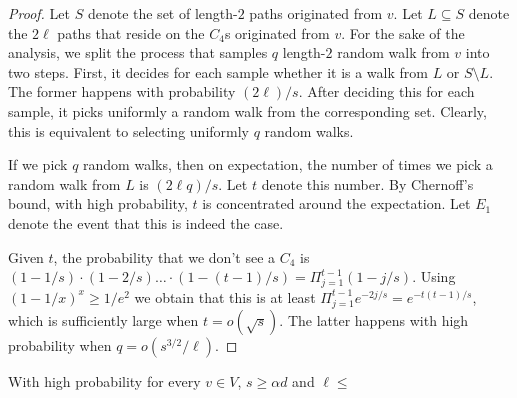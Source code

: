 \begin{proof}
Let $S$ denote the set of length-$2$ paths originated from $v$. 
Let $L \subseteq S$ denote the $2\ell$ paths that reside on the $C_4$s originated from $v$.
For the sake of the analysis, we split the process that samples $q$ length-$2$ random walk from $v$ into two steps.
First, it decides for each sample whether it is a walk from $L$ or $S\setminus L$. The former happens with probability $(2\ell)/s$.
After deciding this for each sample, it picks uniformly a random walk from the corresponding set.
Clearly, this is equivalent to selecting uniformly $q$ random walks.

If we pick $q$ random walks, then on expectation, the number of times we pick a random walk from $L$ is $(2\ell q)/s$.
Let $t$ denote this number.
By Chernoff's bound, with high probability, $t$ is concentrated around the expectation. 
Let $E_1$ denote the event that this is indeed the case.

Given $t$, the probability that we don't see a $C_4$ is $(1-1/s)\cdot (1-2/s)\ldots \cdot (1-(t-1)/s) = \Pi_{j=1}^{t-1}\left(1 - j/s\right)$.
Using $(1-1/x)^x \geq 1/e^2$  we obtain that this is at least  $\Pi_{j=1}^{t-1} e^{-2j/s} = e^{-t(t-1)/s}$, which is sufficiently large when $t = o(\sqrt{s})$.
The latter happens with high probability when $q = o(s^{3/2}/\ell)$.
\end{proof}

\begin{claim}
    With high probability for every $v\in V$, $s \geq \alpha d$ and $\ell \leq $ 
\end{claim}